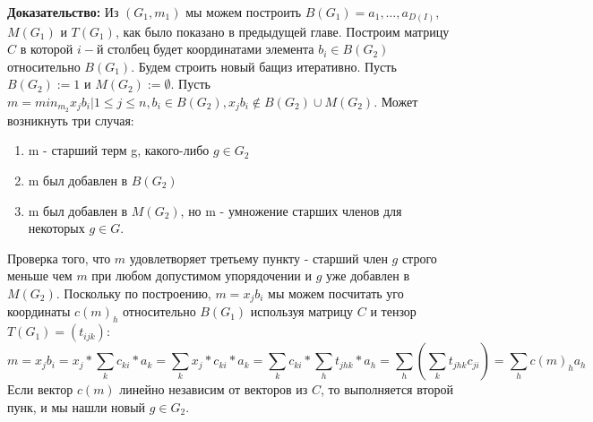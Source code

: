 \documentclass{article}
\begin{document}
    \textbf{Доказательство:} Из $(G_1, m_1)$ мы можем построить $B(G_1) = {a_1,\ldots,a_{D(I)}}$, $M(G_1)$ и $T(G_1)$, как
    было показано в предыдущей главе. Построим матрицу $C$ в которой $i-$й столбец будет координатами элемента $b_i \in B(G_2)$
    относительно $B(G_1)$.
    Будем строить новый бащиз итеративно.
    Пусть $B(G_2) := {1}$ и $M(G_2) := \emptyset$. Пусть $m = min_{m_2} {x_jb_i | 1\leq j \leq n, b_i \in B(G_2), 
    x_jb_i\notin B(G_2)\cup M(G_2)}$. Может возникнуть три случая:
    \begin{enumerate}
        \item m - старший терм g, какого-либо $g \in G_2$
        \item m был добавлен в $B(G_2)$
        \item m был добавлен в $M(G_2)$, но m - умножение старших членов для некоторых $g \in G$.
    \end{enumerate}
    Проверка того, что $m$ удовлетворяет третьему пункту - старший член $g$ строго меньше чем $m$ при любом допустимом упорядочении
    и $g$ уже добавлен в $M(G_2)$.
    Поскольку по построению, $m=x_jb_i$ мы можем посчитать уго координаты $c(m)_h$ относительно $B(G_1)$ используя матрицу $C$ и тензор
    $T(G_1) = (t_{ijk})$:
    $$m=x_jb_i=x_j*\sum_k c_{ki}*a_k = \sum_k x_j*c_{ki}*a_k = \sum_k c_{ki}*\sum_h t_{jhk}*a_h = \sum_h (\sum_k t_{jhk}c_{ji}) = \sum_h c(m)_ha_h$$
    Если вектор $c(m)$ линейно независим от векторов из $C$, то выполняется второй пунк, и мы нашли новый $g \in G_2$.
    \newpage
\end{document}

